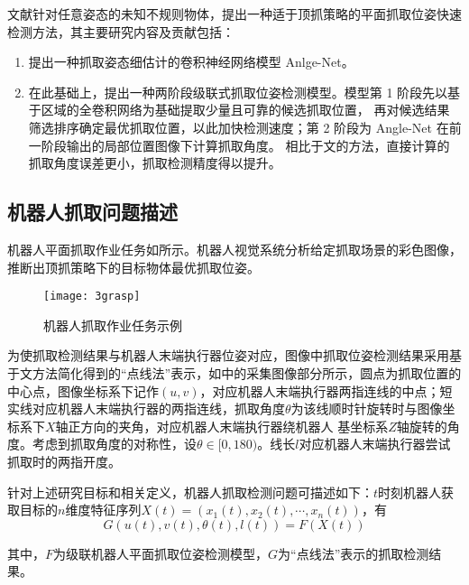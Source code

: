 文献\cite{bib:three}针对任意姿态的未知不规则物体，提出一种适于顶抓策略的平面抓取位姿快速检测方法，其主要研究内容及贡献包括：

\begin{enumerate}[fullwidth, label=(\arabic*), itemindent=2em]
\item 提出一种抓取姿态细估计的卷积神经网络模型 Anlge-Net。

\item 在此基础上，提出一种两阶段级联式抓取位姿检测模型。模型第 1 阶段先以基于区域的全卷积网络为基础提取少量且可靠的候选抓取位置， 再对候选结果筛选排序确定最优抓取位置，以此加快检测速度；第 2 阶段为 Angle-Net 在前一阶段输出的局部位置图像下计算抓取角度。 相比于文\cite{bibb9}的方法，直接计算的抓取角度误差更小，抓取检测精度得以提升。
\end{enumerate}

\subsection{机器人抓取问题描述}

机器人平面抓取作业任务如所示。机器人视觉系统分析给定抓取场景的彩色图像，推断出顶抓策略下的目标物体最优抓取位姿。

\begin{figure}[!htbp]
	\centering
	\texttt{[image: 3grasp]}
	\caption{机器人抓取作业任务示例}
     \label{figgrasp}
\end{figure}

为使抓取检测结果与机器人末端执行器位姿对应，图像中抓取位姿检测结果采用基于文\cite{bibb4}方法简化得到的“点线法”表示，如中的采集图像部分所示，圆点为抓取位置的中心点，图像坐标系下记作$(u, v)$，对应机器人末端执行器两指连线的中点；短实线对应机器人末端执行器的两指连线，抓取角度$\theta$为该线顺时针旋转时与图像坐标系下$X$轴正方向的夹角，对应机器人末端执行器绕机器人 基坐标系$Z$轴旋转的角度。考虑到抓取角度的对称性，设$\theta\in [0, 180)$。线长$l$对应机器人末端执行器尝试抓取时的两指开度。

针对上述研究目标和相关定义，机器人抓取检测问题可描述如下：$t$时刻机器人获取目标的$n$维度特征序列$X (t) = (x_1(t), x_2(t),\cdots, x_n(t))$，有
\begin{equation}
G(u(t), v(t), \theta(t), l(t)) = F(X (t))
\end{equation}

其中，$F$为级联机器人平面抓取位姿检测模型，$G$为“点线法”表示的抓取检测结果。

